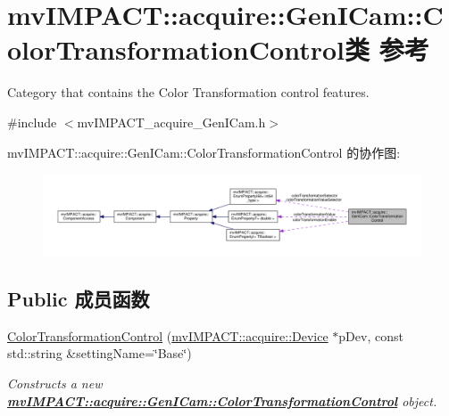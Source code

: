 \hypertarget{classmv_i_m_p_a_c_t_1_1acquire_1_1_gen_i_cam_1_1_color_transformation_control}{\section{mv\+I\+M\+P\+A\+C\+T\+:\+:acquire\+:\+:Gen\+I\+Cam\+:\+:Color\+Transformation\+Control类 参考}
\label{classmv_i_m_p_a_c_t_1_1acquire_1_1_gen_i_cam_1_1_color_transformation_control}
}


Category that contains the Color Transformation control features.  




{\ttfamily \#include $<$mv\+I\+M\+P\+A\+C\+T\+\_\+acquire\+\_\+\+Gen\+I\+Cam.\+h$>$}



mv\+I\+M\+P\+A\+C\+T\+:\+:acquire\+:\+:Gen\+I\+Cam\+:\+:Color\+Transformation\+Control 的协作图\+:
\nopagebreak
\begin{figure}[H]
\begin{center}
\leavevmode
\includegraphics[width=350pt]{classmv_i_m_p_a_c_t_1_1acquire_1_1_gen_i_cam_1_1_color_transformation_control__coll__graph}
\end{center}
\end{figure}
\subsection*{Public 成员函数}
\begin{DoxyCompactItemize}
\item 
\hyperlink{classmv_i_m_p_a_c_t_1_1acquire_1_1_gen_i_cam_1_1_color_transformation_control_a5acb6faedf2372988c37941343c013df}{Color\+Transformation\+Control} (\hyperlink{classmv_i_m_p_a_c_t_1_1acquire_1_1_device}{mv\+I\+M\+P\+A\+C\+T\+::acquire\+::\+Device} $\ast$p\+Dev, const std\+::string \&setting\+Name=\char`\"{}Base\char`\"{})
\begin{DoxyCompactList}\small\item\em Constructs a new {\bfseries \hyperlink{classmv_i_m_p_a_c_t_1_1acquire_1_1_gen_i_cam_1_1_color_transformation_control}{mv\+I\+M\+P\+A\+C\+T\+::acquire\+::\+Gen\+I\+Cam\+::\+Color\+Transformation\+Control}} object. \end{DoxyCompactList}\end{DoxyCompactItemize}
